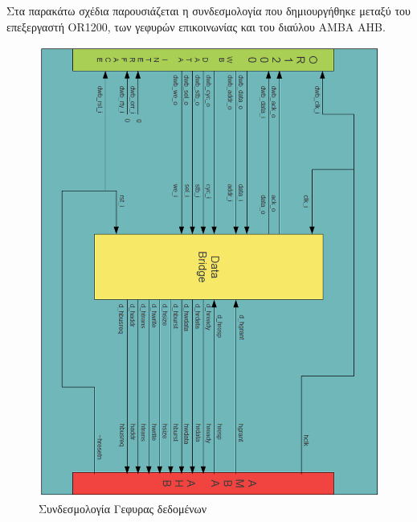 \documentclass[a4paper,10pt]{article}
\numberwithin{figure}{section}
\numberwithin{table}{section}
\begin{document}
Στα παρακάτω σχέδια παρουσιάζεται η συνδεσμολογία που δημιουργήθηκε μεταξύ του επεξεργαστή OR1200, των γεφυρών επικοινωνίας και του διαύλου ΑΜΒΑ ΑΗΒ.
\newpage
\begin{figure}[h!]
 \centering
 \includegraphics[bb=0 0 851 1125,scale=0.41]{./Images/signals_D.png}
 \caption{Συνδεσμολογία Γεφυρας δεδομένων}
\end{figure}
\newpage
\end{document}

